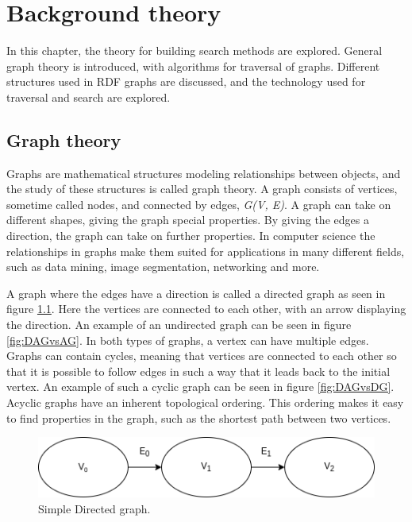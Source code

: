 \chapter{Background theory}
\label{cha:background_theory}
In this chapter, the theory for building search methods are explored. General graph theory is introduced, with algorithms for traversal of graphs. Different structures used in RDF graphs are discussed, and the technology used for traversal and search are explored.

\section{Graph theory}
Graphs are mathematical structures modeling relationships between objects, and the study of these structures is called graph theory. A graph consists of vertices, sometime called nodes, and connected by edges, \emph{G(V, E)}. A graph can take on different shapes, giving the graph special properties. By giving the edges a direction, the graph can take on further properties. In computer science the relationships in graphs make them suited for applications in many different fields, such as data mining, image segmentation, networking and more\cite{riaz2011applications}. 

A graph where the edges have a direction is called a directed graph as seen in figure \ref{fig:DAG}. Here the vertices are connected to each other, with an arrow displaying the direction. An example of an undirected graph can be seen in figure \ref{fig:DAGvsAG}. In both types of graphs, a vertex can have multiple edges. Graphs can contain cycles, meaning that vertices are connected to each other so that it is possible to follow edges in such a way that it leads back to the initial vertex. An example of such a cyclic graph can be seen in figure \ref{fig:DAGvsDG}. Acyclic graphs have an inherent topological ordering. This ordering makes it easy to find properties in the graph, such as the shortest path between two vertices.

\begin{figure}[h]
    \centering
    \includegraphics[scale=0.5]{figs/simpleDAG.png}
    \caption{Simple Directed graph.}
    \label{fig:DAG}
\end{figure}


